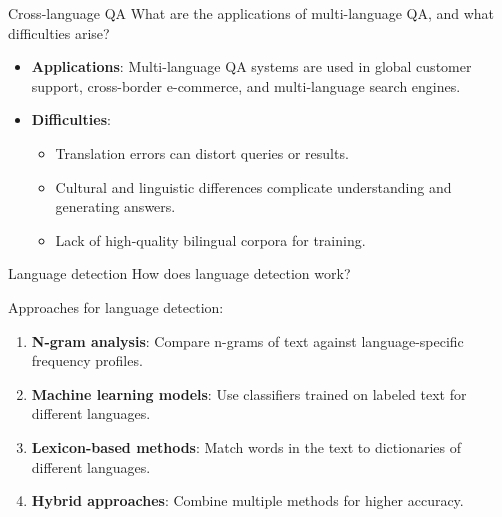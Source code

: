 \documentclass{article}
\begin{document}
\begin{exercise}{Cross-language QA}
  What are the applications of multi-language QA, and what difficulties arise?

  \begin{solution}
    \begin{itemize}
        \item \textbf{Applications}: Multi-language QA systems are used in global customer support, cross-border e-commerce, and multi-language search engines.
        \item \textbf{Difficulties}:
        \begin{itemize}
            \item Translation errors can distort queries or results.
            \item Cultural and linguistic differences complicate understanding and generating answers.
            \item Lack of high-quality bilingual corpora for training.
        \end{itemize}
    \end{itemize}
  \end{solution}
\end{exercise}

\begin{exercise}{Language detection}
  How does language detection work?

  \begin{solution}
    Approaches for language detection:
    \begin{enumerate}
        \item \textbf{N-gram analysis}: Compare n-grams of text against language-specific frequency profiles.
        \item \textbf{Machine learning models}: Use classifiers trained on labeled text for different languages.
        \item \textbf{Lexicon-based methods}: Match words in the text to dictionaries of different languages.
        \item \textbf{Hybrid approaches}: Combine multiple methods for higher accuracy.
    \end{enumerate}
  \end{solution}
\end{exercise}
\end{document}
